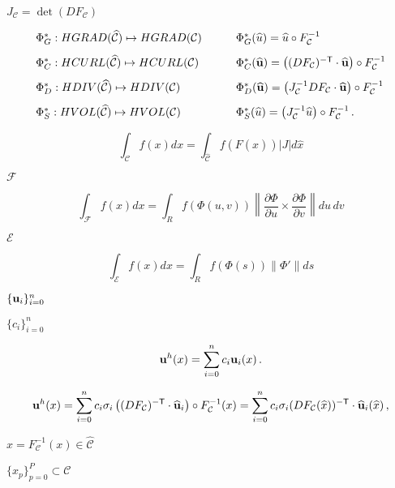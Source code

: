 \documentclass{article}
\begin{document}
$J_{\mathcal C} = \det(DF_{\mathcal C})$
\pagebreak

\[
    \begin{array}{ll}
      \Phi^*_G : HGRAD(\widehat{{\mathcal C}}) \mapsto HGRAD({\mathcal C})&
      \qquad \Phi^*_G(\widehat{u}) = \widehat{u}\circ F^{-1}_{\mathcal C} \\[2ex]
      \Phi^*_C : HCURL(\widehat{{\mathcal C}}) \mapsto HCURL({\mathcal C})&
      \qquad \Phi^*_C(\widehat{\bf u}) = \left((DF_{\mathcal C})^{-{\sf T}}\cdot\widehat{\bf u}\right)\circ F^{-1}_{\mathcal C} \\[2ex]
      \Phi^*_D : HDIV(\widehat{{\mathcal C}}) \mapsto HDIV({\mathcal C})&
      \qquad \Phi^*_D(\widehat{\bf u}) = \left(J^{-1}_{\mathcal C} DF_{\mathcal C}\cdot\widehat{\bf u}\right)\circ F^{-1}_{\mathcal C} 
      \\[2ex]
      \Phi^*_S : HVOL(\widehat{{\mathcal C}}) \mapsto HVOL({\mathcal C})&
      \qquad \Phi^*_S(\widehat{u}) = \left(J^{-1}_{\mathcal C} \widehat{u}\right) \circ F^{-1}_{\mathcal C} \,.
    \end{array}
 \]
\pagebreak

\[
          \int_{{\mathcal C}} f(x) dx = \int_{\widehat{{\mathcal C}}} f(F(\widehat{x})) |J | d\widehat{x}
      \]
\pagebreak

$\mathcal{F}$
\pagebreak

\[
          \int_{\mathcal{F}} f(x) dx = \int_{R} f(\Phi(u,v)) 
          \left\|\frac{\partial\Phi}{\partial u}\times \frac{\partial\Phi}{\partial v}\right\| du\,dv
      \]
\pagebreak

$\mathcal{E}$
\pagebreak

\[
          \int_{\mathcal{E}} f(x) dx = \int_{R} f(\Phi(s)) \|\Phi'\| ds
      \]
\pagebreak

$\{{\bf u}_i\}_{i=0}^n$
\pagebreak

$\{c_i\}_{i=0}^n$
\pagebreak

\[
      {\bf u}^h(x) = \sum_{i=0}^n c_i {\bf u}_i(x) \,.
 \]
\pagebreak

\[
      {\bf u}^h(x) = \sum_{i=0}^n c_i \sigma_i
               \left((DF_{\mathcal C})^{-{\sf T}}\cdot\widehat{\bf u}_i\right)\circ 
                     F^{-1}_{\mathcal C}(x) 
             = \sum_{i=0}^n c_i \sigma_i 
                    (DF_{\mathcal C}(\widehat{x}))^{-{\sf T}}\cdot\widehat{\bf u}_i(\widehat{x})\,,
 \]
\pagebreak

$ \widehat{x} = F^{-1}_{\mathcal C}(x) \in \widehat{\mathcal C} $
\pagebreak

$\{x_p\}_{p=0}^P \subset {\mathcal C}$
\pagebreak
\end{document}
